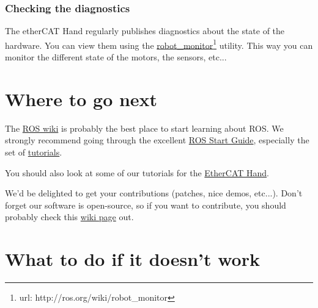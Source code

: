 \documentclass[12pt]{article}
\newcommand{\betterhref}[2]{\href{#1}{#2}\footnote{url: #1}}
\begin{document}
\subsubsection{Checking the diagnostics}
\par The etherCAT Hand regularly publishes diagnostics about the state of the hardware. You can view them using the \betterhref{http://ros.org/wiki/robot\_monitor}{robot\_monitor} utility. This way you can monitor the different state of the motors, the sensors, etc...

\newpage

\section{Where to go next}
\label{sec:where-to-go}
\par The \href{http://ros.org/wiki}{ROS wiki} is probably the best place to start learning about ROS. We strongly recommend going through the excellent \href{http://ros.org/wiki/ROS/StartGuide}{ROS Start Guide}, especially the set of \href{http://ros.org/wiki/ROS/Tutorials}{tutorials}.\\

\par You should also look at some of our tutorials for the \href{http://ros.org/wiki/shadow_robot_etherCAT/Tutorials}{EtherCAT Hand}.\\

\par We'd be delighted to get your contributions (patches, nice demos, etc...). Don't forget our software is open-source, so if you want to contribute, you should probably check this \href{http://ros.org/wiki/shadow_robot#Contributing}{wiki page} out.
\newpage

\section{What to do if it doesn't work}
\label{sec:what-do-if}
\end{document}
